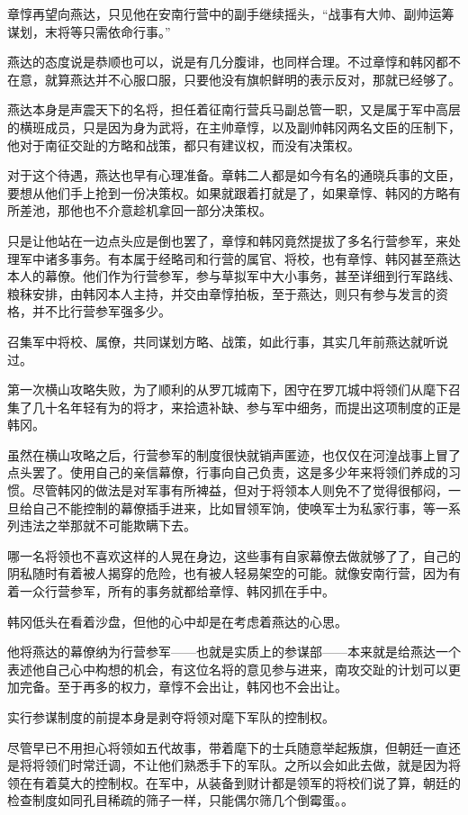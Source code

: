 章惇再望向燕达，只见他在安南行营中的副手继续摇头，“战事有大帅、副帅运筹谋划，末将等只需依命行事。”

燕达的态度说是恭顺也可以，说是有几分腹诽，也同样合理。不过章惇和韩冈都不在意，就算燕达并不心服口服，只要他没有旗帜鲜明的表示反对，那就已经够了。

燕达本身是声震天下的名将，担任着征南行营兵马副总管一职，又是属于军中高层的横班成员，只是因为身为武将，在主帅章惇，以及副帅韩冈两名文臣的压制下，他对于南征交趾的方略和战策，都只有建议权，而没有决策权。

对于这个待遇，燕达也早有心理准备。章韩二人都是如今有名的通晓兵事的文臣，要想从他们手上抢到一份决策权。如果就跟着打就是了，如果章惇、韩冈的方略有所差池，那他也不介意趁机拿回一部分决策权。

只是让他站在一边点头应是倒也罢了，章惇和韩冈竟然提拔了多名行营参军，来处理军中诸多事务。有本属于经略司和行营的属官、将校，也有章惇、韩冈甚至燕达本人的幕僚。他们作为行营参军，参与草拟军中大小事务，甚至详细到行军路线、粮秣安排，由韩冈本人主持，并交由章惇拍板，至于燕达，则只有参与发言的资格，并不比行营参军强多少。

召集军中将校、属僚，共同谋划方略、战策，如此行事，其实几年前燕达就听说过。

第一次横山攻略失败，为了顺利的从罗兀城南下，困守在罗兀城中将领们从麾下召集了几十名年轻有为的将才，来拾遗补缺、参与军中细务，而提出这项制度的正是韩冈。

虽然在横山攻略之后，行营参军的制度很快就销声匿迹，也仅仅在河湟战事上冒了点头罢了。使用自己的亲信幕僚，行事向自己负责，这是多少年来将领们养成的习惯。尽管韩冈的做法是对军事有所裨益，但对于将领本人则免不了觉得很郁闷，一旦给自己不能控制的幕僚插手进来，比如冒领军饷，使唤军士为私家行事，等一系列违法之举那就不可能欺瞒下去。

哪一名将领也不喜欢这样的人晃在身边，这些事有自家幕僚去做就够了了，自己的阴私随时有着被人揭穿的危险，也有被人轻易架空的可能。就像安南行营，因为有着一众行营参军，所有的事务就都给章惇、韩冈抓在手中。

韩冈低头在看着沙盘，但他的心中却是在考虑着燕达的心思。

他将燕达的幕僚纳为行营参军——也就是实质上的参谋部——本来就是给燕达一个表述他自己心中构想的机会，有这位名将的意见参与进来，南攻交趾的计划可以更加完备。至于再多的权力，章惇不会出让，韩冈也不会出让。

实行参谋制度的前提本身是剥夺将领对麾下军队的控制权。

尽管早已不用担心将领如五代故事，带着麾下的士兵随意举起叛旗，但朝廷一直还是将将领们时常迁调，不让他们熟悉手下的军队。之所以会如此去做，就是因为将领在有着莫大的控制权。在军中，从装备到财计都是领军的将校们说了算，朝廷的检查制度如同孔目稀疏的筛子一样，只能偶尔筛几个倒霉蛋。。

